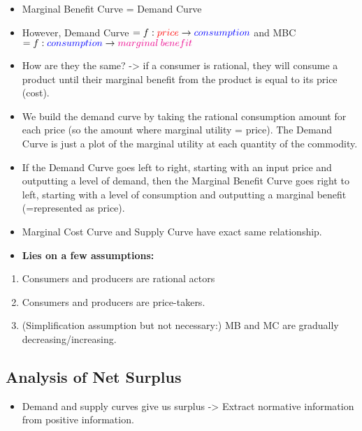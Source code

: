 \documentclass[
]{ltjarticle}
\providecommand{\tightlist}{%
  \setlength{\itemsep}{0pt}\setlength{\parskip}{0pt}}
\begin{document}
\begin{itemize}
\item
  Marginal Benefit Curve = Demand Curve
\item
  However, Demand Curve
  \(= f: \textcolor{red}{price} \to \textcolor{blue}{consumption}\) and
  MBC
  \(= f:\textcolor{blue}{consumption} \to \textcolor{magenta}{marginal \: benefit}\)
\item
  How are they the same? -\textgreater{} if a consumer is rational, they
  will consume a product until their marginal benefit from the product
  is equal to its price (cost).
\item
  We build the demand curve by taking the rational consumption amount
  for each price (so the amount where marginal utility = price). The
  Demand Curve is just a plot of the marginal utility at each quantity
  of the commodity.
\item
  If the Demand Curve goes left to right, starting with an input price
  and outputting a level of demand, then the Marginal Benefit Curve goes
  right to left, starting with a level of consumption and outputting a
  marginal benefit (=represented as price).\\
\item
  Marginal Cost Curve and Supply Curve have exact same relationship.\\
\item
  \hypertarget{foo}{\textbf{Lies on a few assumptions:}}
\end{itemize}

\begin{enumerate}
\def\labelenumi{\arabic{enumi}.}
\tightlist
\item
  Consumers and producers are rational actors\\
\item
  Consumers and producers are price-takers.\\
\item
  (Simplification assumption but not necessary:) MB and MC are gradually
  decreasing/increasing.
\end{enumerate}

\hypertarget{analysis-of-net-surplus}{%
\subsection{Analysis of Net Surplus}\label{analysis-of-net-surplus}}

\begin{itemize}
\tightlist
\item
  Demand and supply curves give us surplus -\textgreater{} Extract
  normative information from positive information.
\end{itemize}
\end{document}
